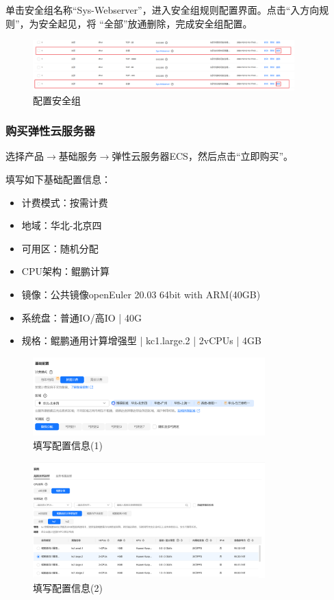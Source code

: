 \documentclass{article}
\begin{document}
单击安全组名称“Sys-Webserver”，进入安全组规则配置界面。点击“入方向规则”，为安全起见，将 “全部”放通删除，完成安全组配置。

\begin{figure}[H]
\centering
\includegraphics[width=0.9\textwidth]{img/1.3.png}
\caption{配置安全组}
\end{figure}

\subsubsection{购买弹性云服务器}

选择产品\(\to\)基础服务\(\to\)弹性云服务器ECS，然后点击“立即购买”。

填写如下基础配置信息：

\begin{itemize}[noitemsep]
    \item 计费模式：按需计费
    \item 地域：华北-北京四
    \item 可用区：随机分配
    \item CPU架构：鲲鹏计算
    \item 镜像：公共镜像openEuler 20.03 64bit with ARM(40GB)
    \item 系统盘：普通IO/高IO | 40G
    \item 规格：鲲鹏通用计算增强型 | kc1.large.2 | 2vCPUs | 4GB
\end{itemize}

\begin{figure}[H]
\centering
\includegraphics[width=0.8\textwidth]{img/1.4.1.png}
\caption{填写配置信息(1)}
\end{figure}

\begin{figure}[H]
\centering
\includegraphics[width=0.8\textwidth]{img/1.4.2.png}
\caption{填写配置信息(2)}
\end{figure}
\end{document}
